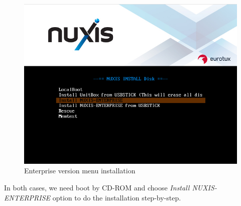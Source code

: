 \begin{figure}[H]
	\begin{center}
	\includegraphics[scale=0.4]{screenshots/install/nuxis/bootmenu.png}
	\caption{Enterprise version menu installation}
	\label{fig:boot_install_screen_enterprise}
	\end{center}
\end{figure}

In both cases, we need boot by CD-ROM and choose \emph{Install NUXIS-ENTERPRISE} option to do the installation step-by-step.

